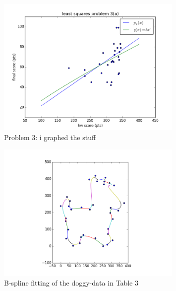 \documentclass[10pt]{article}
\theoremstyle{plain}
\theoremstyle{definition}
\numberwithin{equation}{section}
\begin{document}
\begin{figure}[p]
    \begin{center}
        \includegraphics[width=0.8\textwidth]{p3}
        \caption{Problem 3: i graphed the stuff}
    \end{center}
\end{figure}

\begin{figure}[p]
    \begin{center}
    \includegraphics[width=0.8\textwidth]{doggy_splines}
    \caption{B-spline fitting of the doggy-data in Table 3}
\end{center}
\end{figure}
\end{document}
